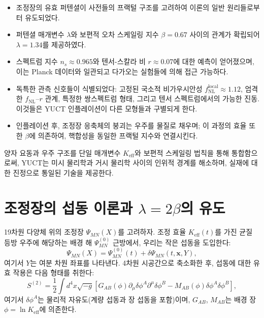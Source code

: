 \documentclass[11pt,a4paper]{article}
\newcommand{\Keff}{K_{\mathrm{eff}}}
\begin{document}
	\begin{itemize}
		\item 조정장의 유효 퍼텐셜이 사전들의 프랙털 구조를 고려하여 이론의 일반 원리들로부터 유도되었다.
		\item 퍼텐셜 매개변수 \(\lambda\)와 보편적 오차 스케일링 지수 \(\beta = 0.67\) 사이의 관계가 확립되어 \(\lambda = 1.34\)를 제공하였다.
		\item 스펙트럼 지수 \(n_s \approx 0.965\)와 텐서-스칼라 비 \(r \approx 0.07\)에 대한 예측이 얻어졌으며, 이는 Planck 데이터와 일관되고 다가오는 실험들에 의해 접근 가능하다.
		\item 독특한 관측 신호들이 식별되었다: 고정된 국소적 비가우시안성 \(f_{\text{NL}}^{\text{local}} \approx 1.12\), 엄격한 \(f_{\text{NL}}\)–\(r\) 관계, 특정한 쌍스펙트럼 형태, 그리고 텐서 스펙트럼에서의 가능한 진동. 이것들은 YUCT 인플레이션이 다른 모형들과 구별되게 한다.
		\item 인플레이션 후, 조정장 응축체의 붕괴는 우주를 물질로 채우며; 이 과정의 효율 또한 \(\beta\)에 의존하여, 핵합성을 동일한 프랙털 지수와 연결시킨다.
	\end{itemize}
	
	양자 요동과 우주 구조를 단일 매개변수 \(K_{\mathrm{eff}}\)와 보편적 스케일링 법칙을 통해 통합함으로써, YUCT는 미시 물리학과 거시 물리학 사이의 인위적 경계를 해소하며, 실재에 대한 진정으로 통일된 기술을 제공한다.
	
	\appendix
	\section{조정장의 섭동 이론과 \(\lambda = 2\beta\)의 유도}
	\label{app:perturbations}
	
	19차원 다양체 위의 조정장 \(\Psi_{MN}(X)\)를 고려하자. 조정 효율 \(\Keff(t)\)를 가진 균질 등방 우주에 해당하는 배경 해 \(\Psi^{(0)}_{MN}\) 근방에서, 우리는 작은 섭동을 도입한다:
	\begin{equation}
		\Psi_{MN}(X) = \Psi^{(0)}_{MN}(t) + \delta\Psi_{MN}(t,\mathbf{x},Y),
	\end{equation}
	여기서 \(Y\)는 여분 차원 좌표를 나타낸다. 4차원 시공간으로 축소화한 후, 섭동에 대한 유효 작용은 다음 형태를 취한다:
	\begin{equation}
		S^{(2)} = \frac{1}{2} \int d^4x \sqrt{-g} \left[ G_{AB}(\phi) \partial_\mu \delta\phi^A \partial^\mu \delta\phi^B - M_{AB}(\phi) \delta\phi^A \delta\phi^B \right],
	\end{equation}
	여기서 \(\delta\phi^A\)는 물리적 자유도(계량 섭동과 장 섭동을 포함)이며, \(G_{AB}\), \(M_{AB}\)는 배경 장 \(\phi = \ln\Keff\)에 의존한다.
	
\end{document}
